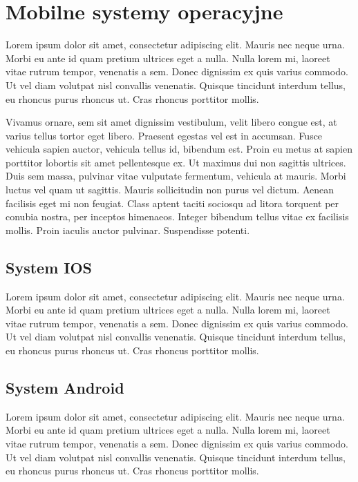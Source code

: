 \documentclass[a4paper,12pt,oneside]{book}
\begin{document}
	\section{Mobilne systemy operacyjne}
	Lorem ipsum dolor sit amet, consectetur adipiscing elit. Mauris nec neque urna. Morbi eu ante id quam pretium ultrices eget a nulla. Nulla lorem mi, laoreet vitae rutrum tempor, venenatis a sem. Donec dignissim ex quis varius commodo. Ut vel diam volutpat nisl convallis venenatis. Quisque tincidunt interdum tellus, eu rhoncus purus rhoncus ut. Cras rhoncus porttitor mollis.
	
	Vivamus ornare, sem sit amet dignissim vestibulum, velit libero congue est, at varius tellus tortor eget libero. Praesent egestas vel est in accumsan. Fusce vehicula sapien auctor, vehicula tellus id, bibendum est. Proin eu metus at sapien porttitor lobortis sit amet pellentesque ex. Ut maximus dui non sagittis ultrices. Duis sem massa, pulvinar vitae vulputate fermentum, vehicula at mauris. Morbi luctus vel quam ut sagittis. Mauris sollicitudin non purus vel dictum. Aenean facilisis eget mi non feugiat. Class aptent taciti sociosqu ad litora torquent per conubia nostra, per inceptos himenaeos. Integer bibendum tellus vitae ex facilisis mollis. Proin iaculis auctor pulvinar. Suspendisse potenti.
	
	\subsection{System IOS}
	Lorem ipsum dolor sit amet, consectetur adipiscing elit. Mauris nec neque urna. Morbi eu ante id quam pretium ultrices eget a nulla. Nulla lorem mi, laoreet vitae rutrum tempor, venenatis a sem. Donec dignissim ex quis varius commodo. Ut vel diam volutpat nisl convallis venenatis. Quisque tincidunt interdum tellus, eu rhoncus purus rhoncus ut. Cras rhoncus porttitor mollis.
	
	\subsection{System Android}
	Lorem ipsum dolor sit amet, consectetur adipiscing elit. Mauris nec neque urna. Morbi eu ante id quam pretium ultrices eget a nulla. Nulla lorem mi, laoreet vitae rutrum tempor, venenatis a sem. Donec dignissim ex quis varius commodo. Ut vel diam volutpat nisl convallis venenatis. Quisque tincidunt interdum tellus, eu rhoncus purus rhoncus ut. Cras rhoncus porttitor mollis.
	
	\newpage
\end{document}
